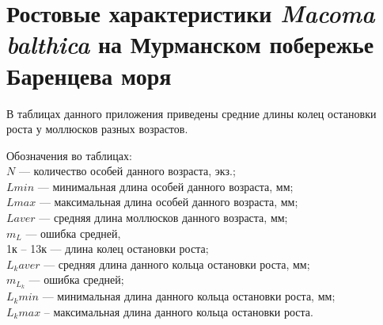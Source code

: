 
\section{Ростовые характеристики {\it Macoma balthica} на Мурманском побережье Баренцева моря}
\label{app:growth_matrix}

В   таблицах данного приложения   приведены средние длины колец остановки роста у моллюсков разных возрастов.

\vspace{5em}

Обозначения во таблицах:\\[2em]
$N$ --- количество  особей  данного возраста, экз.;\\
$L min$  ---  минимальная   длина  особей   данного   возраста,   мм;\\
$L max$   ---   максимальная   длина   особей   данного   возраста,   мм;\\
$L aver$ --- средняя длина моллюсков данного возраста, мм;\\
$m_L$ --- ошибка средней,\\
1к -- 13к --- длина колец остановки роста;\\
$L_k aver$ --- средняя длина данного кольца остановки роста, мм;\\
$m_{L_k}$ --- ошибка средней;\\
$L_k min$ --- минимальная длина данного кольца остановки роста, мм; \\
$L_k   max$   --   максимальная   длина   данного   кольца   остановки   роста.   \\



